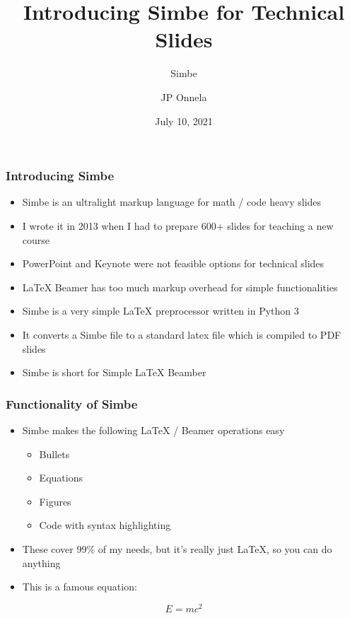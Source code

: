 
\title[Simbe]{Introducing Simbe for Technical Slides}
\subtitle{Simbe}
\author[JP Onnela]{JP Onnela}
\date[July 10, 2021]{July 10, 2021}
\frame{\titlepage}

\begin{frame}[fragile]
\frametitle{Introducing Simbe}
\begin{itemize}
	\item Simbe is an ultralight markup language for math / code heavy slides
	\item I wrote it in 2013 when I had to prepare 600+ slides for teaching a new course
	\item PowerPoint and Keynote were not feasible options for technical slides
	\item LaTeX Beamer has too much markup overhead for simple functionalities
	\item Simbe is a very simple LaTeX preprocessor written in Python 3
	\item It converts a Simbe file to a standard latex file which is compiled to PDF slides
	\item Simbe is short for Simple LaTeX Beamber
\end{itemize}

\end{frame}
\begin{frame}[fragile]
\frametitle{Functionality of Simbe}
\begin{itemize}
	\item Simbe makes the following LaTeX / Beamer operations easy
	\begin{itemize}
	    \item Bullets
	    \item Equations
	    \item Figures
	    \item Code with syntax highlighting
	\end{itemize}
	\item These cover 99\% of my needs, but it's really just LaTeX, so you can do anything
	\item This is a famous equation:
\end{itemize}
\begin{equation}
E=mc^2
\end{equation}

\end{frame}
